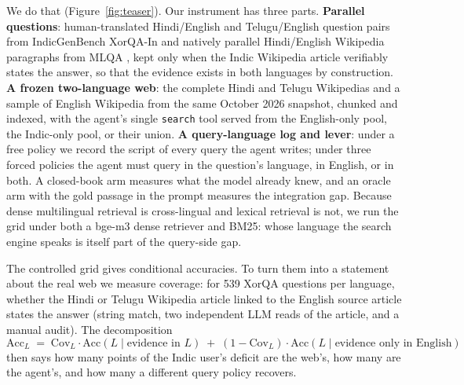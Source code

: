 We do that (Figure~\ref{fig:teaser}). Our instrument has three parts. \textbf{Parallel questions}: human-translated Hindi/English and Telugu/English question pairs from IndicGenBench XorQA-In \citep{a2404_16816} and natively parallel Hindi/English Wikipedia paragraphs from MLQA \citep{a1910_07475}, kept only when the Indic Wikipedia article verifiably states the answer, so that the evidence exists in both languages by construction. \textbf{A frozen two-language web}: the complete Hindi and Telugu Wikipedias and a sample of English Wikipedia from the same October 2026 snapshot, chunked and indexed, with the agent's single \texttt{search} tool served from the English-only pool, the Indic-only pool, or their union. \textbf{A query-language log and lever}: under a free policy we record the script of every query the agent writes; under three forced policies the agent must query in the question's language, in English, or in both. A closed-book arm measures what the model already knew, and an oracle arm with the gold passage in the prompt measures the integration gap. Because dense multilingual retrieval is cross-lingual and lexical retrieval is not, we run the grid under both a bge-m3 dense retriever and BM25: whose language the search engine speaks is itself part of the query-side gap.

The controlled grid gives conditional accuracies. To turn them into a statement about the real web we measure coverage: for 539 XorQA questions per language, whether the Hindi or Telugu Wikipedia article linked to the English source article states the answer (string match, two independent LLM reads of the article, and a manual audit). The decomposition
\begin{equation}
\mathrm{Acc}_L \;=\; \mathrm{Cov}_L \cdot \mathrm{Acc}(L \mid \text{evidence in } L) \;+\; (1-\mathrm{Cov}_L)\cdot \mathrm{Acc}(L \mid \text{evidence only in English})
\label{eq:decomp}
\end{equation}
then says how many points of the Indic user's deficit are the web's, how many are the agent's, and how many a different query policy recovers.

